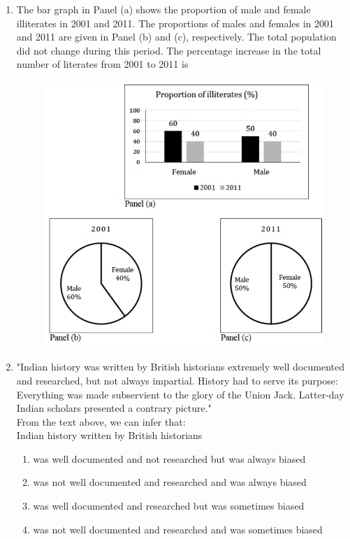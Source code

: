 \documentclass[a4paper, 11pt]{article}
\begin{document}
\begin{enumerate}
    \item The bar graph in Panel (a) shows the proportion of male and female illiterates in 2001 and 2011. The proportions of males and females in 2001 and 2011 are given in Panel (b) and (c), respectively. The total population did not change during this period. The percentage increase in the total number of literates from 2001 to 2011 is
    \begin{figure}[H]
        \centering
        \includegraphics[width=0.8\columnwidth]{figs/GA_Q7.png}
        \caption*{}
        \label{fig:q7}
    \end{figure}
    \begin{enumerate}
    \end{enumerate}
    \hfill{}

    \item "Indian history was written by British historians extremely well documented and researched, but not always impartial. History had to serve its purpose: Everything was made subservient to the glory of the Union Jack. Latter-day Indian scholars presented a contrary picture."\\From the text above, we can infer that:\\Indian history written by British historians
    \begin{enumerate}
        \item was well documented and not researched but was always biased
        \item was not well documented and researched and was always biased
        \item was well documented and researched but was sometimes biased
        \item was not well documented and researched and was sometimes biased
    \end{enumerate}
    \hfill{}


\end{enumerate}
\end{document}
